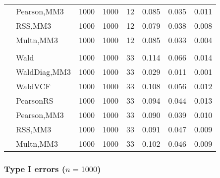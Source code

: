\documentclass[
]{article}
\begin{document}
\begin{table}[H]
{\begin{tabular}[t]{llrrrrrr}
\hspace{1em} & Pearson,MM3 & 1000 & 1000 & 12 & 0.085 & 0.035 & 0.011\\

\hspace{1em} & RSS,MM3 & 1000 & 1000 & 12 & 0.079 & 0.038 & 0.008\\

\hspace{1em} & Multn,MM3 & 1000 & 1000 & 12 & 0.085 & 0.033 & 0.004\\
\cmidrule{1-8}
\addlinespace[0.3em]
\multicolumn{8}{l}{\textbf{3F 15V}}\\
\hspace{1em} & Wald & 1000 & 1000 & 33 & 0.114 & 0.066 & 0.014\\

\hspace{1em} & WaldDiag,MM3 & 1000 & 1000 & 33 & 0.029 & 0.011 & 0.001\\

\hspace{1em} & WaldVCF & 1000 & 1000 & 33 & 0.108 & 0.056 & 0.012\\

\hspace{1em} & PearsonRS & 1000 & 1000 & 33 & 0.094 & 0.044 & 0.013\\

\hspace{1em} & Pearson,MM3 & 1000 & 1000 & 33 & 0.090 & 0.039 & 0.010\\

\hspace{1em} & RSS,MM3 & 1000 & 1000 & 33 & 0.091 & 0.047 & 0.009\\

\hspace{1em} & Multn,MM3 & 1000 & 1000 & 33 & 0.102 & 0.046 & 0.009\\
\bottomrule
\end{tabular}}
\end{table}

\hypertarget{type-i-errors-n1000}{%
\subsubsection{\texorpdfstring{Type I errors
(\(n=1000\))}{Type I errors (n=1000)}}\label{type-i-errors-n1000}}
\end{document}
